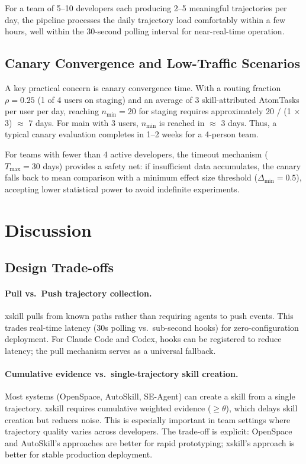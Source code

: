 \documentclass{article}
\begin{document}
For a team of 5--10 developers each producing 2--5 meaningful trajectories per day, the pipeline processes the daily trajectory load comfortably within a few hours, well within the 30-second polling interval for near-real-time operation.

\subsection{Canary Convergence and Low-Traffic Scenarios}

A key practical concern is canary convergence time. With a routing fraction $\rho = 0.25$ (1 of 4 users on staging) and an average of 3 skill-attributed AtomTasks per user per day, reaching $n_{\min} = 20$ for staging requires approximately 20 / (1 $\times$ 3) $\approx$ 7 days. For main with 3 users, $n_{\min}$ is reached in $\approx$ 3 days. Thus, a typical canary evaluation completes in 1--2 weeks for a 4-person team.

For teams with fewer than 4 active developers, the timeout mechanism ($T_{\max} = 30$ days) provides a safety net: if insufficient data accumulates, the canary falls back to mean comparison with a minimum effect size threshold ($\Delta_{\min} = 0.5$), accepting lower statistical power to avoid indefinite experiments.


\section{Discussion}
\label{sec:discussion}

\subsection{Design Trade-offs}

\paragraph{Pull vs.\ Push trajectory collection.} xskill pulls from known paths rather than requiring agents to push events. This trades real-time latency (30s polling vs.\ sub-second hooks) for zero-configuration deployment. For Claude Code and Codex, hooks can be registered to reduce latency; the pull mechanism serves as a universal fallback.

\paragraph{Cumulative evidence vs.\ single-trajectory skill creation.} Most systems (OpenSpace, AutoSkill, SE-Agent) can create a skill from a single trajectory. xskill requires cumulative weighted evidence ($\geq\theta$), which delays skill creation but reduces noise. This is especially important in team settings where trajectory quality varies across developers. The trade-off is explicit: OpenSpace and AutoSkill's approaches are better for rapid prototyping; xskill's approach is better for stable production deployment.
\end{document}
